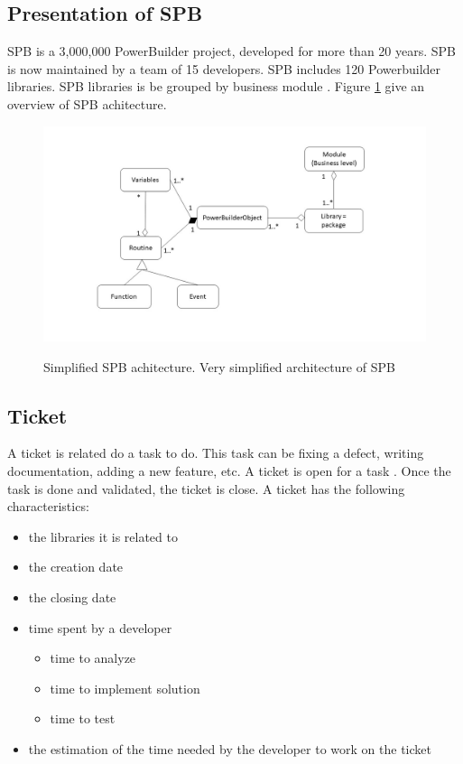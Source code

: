 \documentclass[10pt,conference]{IEEEtran}
\begin{document}
\subsection{Presentation of SPB}
SPB is  a 3,000,000 PowerBuilder project, developed for more than 20 years. SPB is now maintained by a team of 15 developers.  SPB includes 120 Powerbuilder libraries.  SPB libraries  is be grouped by business module . Figure  \ref{fig:pbArchitecture} give an overview of SPB achitecture.
\begin{figure}[!ht]
    \centering
    {\includegraphics[width=0.9\linewidth]{images/pbArchitecture.jpg}}
    \caption{Simplified SPB achitecture.
Very simplified architecture of SPB}\label{fig:pbArchitecture}
 \end{figure} 
\subsection{Ticket}
A ticket is related do a task to do.  This task can be fixing a defect, writing documentation, adding a new feature, etc.  A ticket is open for a task . Once the task is done and validated, the ticket is close. A ticket has the following characteristics:
\begin{itemize}
\item the libraries it  is related to
\item the creation date
\item the closing date
\item time spent by a developer
\begin{itemize}
\item time to analyze
\item time to implement solution
\item time to test
\end{itemize}
\item  the estimation of the time needed by the developer to work on the ticket
\end{itemize}
\end{document}
